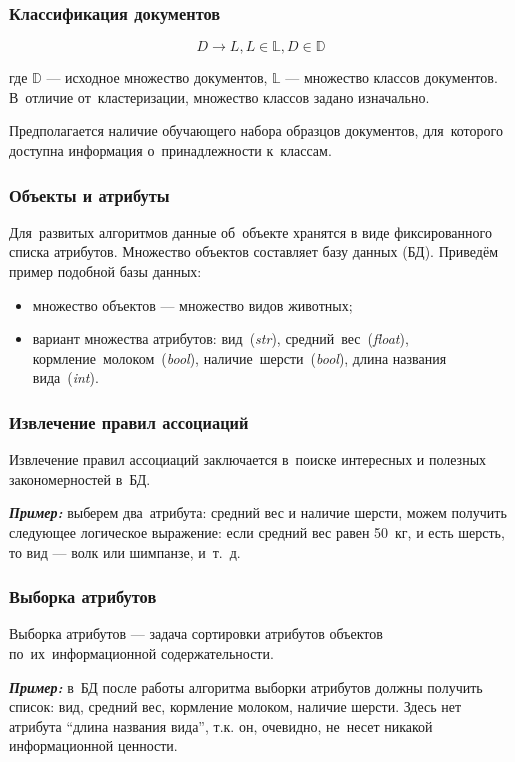 \documentclass{beamer}
\newcommand{\MARK}[1]{{\bf {\it #1}}}
\begin{document}
\begin{frame}
\frametitle{Классификация документов}
$$D \to L, L \in \mathbb{L}, D \in \mathbb{D}$$

\vspace{1cm}

где $\mathbb{D}$ --- исходное множество документов, 
$\mathbb{L}$ --- множество классов документов.
В~отличие от~кластеризации, множество классов задано изначально.

\vspace{5mm}

Предполагается наличие обучающего набора образцов документов, 
для~которого доступна информация о~принадлежности к~классам.
\end{frame}

\begin{frame}
\frametitle{Объекты и атрибуты}

Для~развитых алгоритмов данные  об~объекте хранятся в виде фиксированного списка атрибутов.
Множество объектов составляет базу данных (БД).
Приведём пример подобной базы данных:

\begin{itemize}
\item {множество объектов --- множество видов животных;}
\vspace{1cm}
\item {вариант множества атрибутов:
вид~({\it str}),
средний~вес~({\it float}),
кормление~молоком~({\it bool}),
 наличие~шерсти~({\it bool}),
длина названия вида~({\it int}).
}
\end{itemize}
\end{frame}

\begin{frame}
\frametitle{Извлечение правил ассоциаций}

Извлечение правил ассоциаций заключается в~поиске интересных и полезных закономерностей в~БД.

\vspace{1cm}

\MARK{Пример:}
выберем два~атрибута: средний вес и наличие шерсти,
можем получить следующее логическое выражение:
если средний вес равен 50~кг, и есть шерсть, то вид --- волк или шимпанзе, и~т.~д.
\end{frame}

\begin{frame}
\frametitle{Выборка атрибутов}
Выборка атрибутов --- задача сортировки атрибутов объектов по~их~информационной содержательности.

\vspace{1cm}

\MARK{Пример:}
в~БД после работы алгоритма выборки атрибутов должны получить список:
вид,
средний вес,
кормление молоком,
наличие шерсти.
Здесь нет атрибута ``длина названия вида'',
т.к. он, очевидно, не~несет никакой информационной ценности.
\end{frame}
\end{document}
